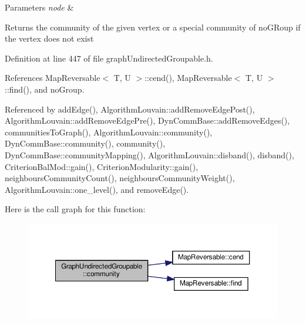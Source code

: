 \begin{DoxyParams}{Parameters}
{\em node} & \\
\hline
\end{DoxyParams}
\begin{DoxyReturn}{Returns}
the community of the given vertex or a special community of no\+G\+Roup if the vertex does not exist 
\end{DoxyReturn}


Definition at line 447 of file graph\+Undirected\+Groupable.\+h.



References Map\+Reversable$<$ T, U $>$\+::cend(), Map\+Reversable$<$ T, U $>$\+::find(), and no\+Group.



Referenced by add\+Edge(), Algorithm\+Louvain\+::add\+Remove\+Edge\+Post(), Algorithm\+Louvain\+::add\+Remove\+Edge\+Pre(), Dyn\+Comm\+Base\+::add\+Remove\+Edges(), communities\+To\+Graph(), Algorithm\+Louvain\+::community(), Dyn\+Comm\+Base\+::community(), community(), Dyn\+Comm\+Base\+::community\+Mapping(), Algorithm\+Louvain\+::disband(), disband(), Criterion\+Bal\+Mod\+::gain(), Criterion\+Modularity\+::gain(), neighbours\+Community\+Count(), neighbours\+Community\+Weight(), Algorithm\+Louvain\+::one\+\_\+level(), and remove\+Edge().

Here is the call graph for this function\+:
\nopagebreak
\begin{figure}[H]
\begin{center}
\leavevmode
\includegraphics[width=350pt]{classGraphUndirectedGroupable_ad40474d566b3f9fbe9d132fbbe562ed5_cgraph}
\end{center}
\end{figure}
\mbox{\label{classGraphUndirectedGroupable_a7a9642a50ac522d9020afb9df211702f}} 
